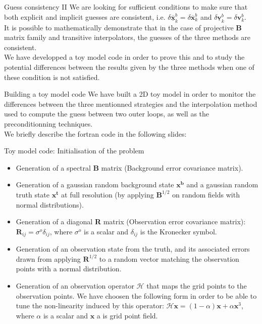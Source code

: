 \documentclass[10pt]{beamer}
\begin{document}
\begin{frame}{Guess consistency II}
We are looking for sufficient conditions to make sure that both explicit and implicit guesses are consistent, i.e. $\delta \underline{\overline{\mathbf{x}}}^b_k = \delta \overline{\mathbf{x}}^b_k$ and $\delta \underline{\mathbf{v}}^b_k = \delta \mathbf{v}^b_k$.\\
\vspace{+0.2cm}
It is possible to mathematically demonstrate that in the case of projective $\mathbf{B}$ matrix family and transitive interpolators, the guesses of the three methods are consistent.\\
\vspace{+0.2cm}
We have developped a toy model code in order to prove this and to study the potential differences between the results given by the three methods when one of these condition is not satisfied.
\end{frame}

\begin{frame}{Building a toy model code}
 We have built a 2D toy model in order to monitor the differences between the three mentionned strategies and the interpolation method used to compute the guess between two outer loops, as well as the preconditionning techniques.\\
 We briefly describe the fortran code in the following slides:
\end{frame} 
 
 \begin{frame}{Toy model code: Initialisation of the problem}
 \begin{itemize}
  \item Generation of a spectral \textbf{B} matrix (Background error covariance matrix).
  \item Generation of a gaussian random background state $\mathbf{x^b}$ and a gaussian random truth state $\mathbf{x^t}$ at full resolution (by applying $\mathbf{B}^{1/2}$ on random fields with normal distributions).
  \item Generation of a diagonal \textbf{R} matrix (Observation error covariance matrix): $\mathbf{R}_{ij}=\sigma^o \delta_{ij}$, where $\sigma^o$ is a scalar and $\delta_{ij}$ is the  Kronecker symbol.
  \item Generation of an observation state from the truth, and its associated errors drawn from applying $\mathbf{R}^{1/2}$ to a random vector matching the observation points with a normal distribution.
  \item Generation of an observation operator $\mathcal{H}$ that maps the grid points to the observation points. We have choosen the following form in order to be able to tune the non-linearity induced by this operator: $\mathcal{H}\mathbf{x} = (1-\alpha)\mathbf{x}+\alpha \mathbf{x}^3$, where $\alpha$ is a scalar and $\mathbf{x}$ a is grid point field.
 \end{itemize}
\end{frame}
\end{document}
